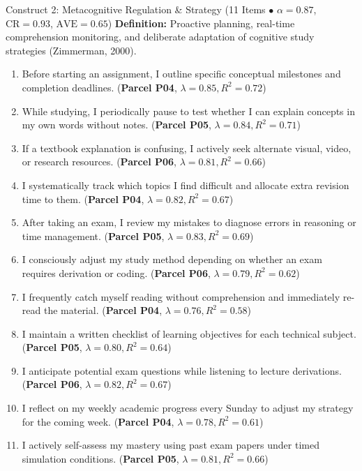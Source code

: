 \documentclass[10pt,a4paper]{article}
\begin{document}
\vspace{0.2cm}
\begin{constructbox}{Construct 2: Metacognitive Regulation \& Strategy (11 Items $\bullet$ $\alpha = 0.87$, $\text{CR} = 0.93$, $\text{AVE} = 0.65$)}
\textbf{Definition:} Proactive planning, real-time comprehension monitoring, and deliberate adaptation of cognitive study strategies (Zimmerman, 2000).
\begin{enumerate}[label=\textbf{Q\arabic*.}, leftmargin=2.5em, itemsep=2pt, resume]
  \item Before starting an assignment, I outline specific conceptual milestones and completion deadlines. \hfill (\textbf{Parcel P04}, $\lambda = 0.85, R^2 = 0.72$)
  \item While studying, I periodically pause to test whether I can explain concepts in my own words without notes. \hfill (\textbf{Parcel P05}, $\lambda = 0.84, R^2 = 0.71$)
  \item If a textbook explanation is confusing, I actively seek alternate visual, video, or research resources. \hfill (\textbf{Parcel P06}, $\lambda = 0.81, R^2 = 0.66$)
  \item I systematically track which topics I find difficult and allocate extra revision time to them. \hfill (\textbf{Parcel P04}, $\lambda = 0.82, R^2 = 0.67$)
  \item After taking an exam, I review my mistakes to diagnose errors in reasoning or time management. \hfill (\textbf{Parcel P05}, $\lambda = 0.83, R^2 = 0.69$)
  \item I consciously adjust my study method depending on whether an exam requires derivation or coding. \hfill (\textbf{Parcel P06}, $\lambda = 0.79, R^2 = 0.62$)
  \item I frequently catch myself reading without comprehension and immediately re-read the material. \hfill (\textbf{Parcel P04}, $\lambda = 0.76, R^2 = 0.58$)
  \item I maintain a written checklist of learning objectives for each technical subject. \hfill (\textbf{Parcel P05}, $\lambda = 0.80, R^2 = 0.64$)
  \item I anticipate potential exam questions while listening to lecture derivations. \hfill (\textbf{Parcel P06}, $\lambda = 0.82, R^2 = 0.67$)
  \item I reflect on my weekly academic progress every Sunday to adjust my strategy for the coming week. \hfill (\textbf{Parcel P04}, $\lambda = 0.78, R^2 = 0.61$)
  \item I actively self-assess my mastery using past exam papers under timed simulation conditions. \hfill (\textbf{Parcel P05}, $\lambda = 0.81, R^2 = 0.66$)
\end{enumerate}
\end{constructbox}
\end{document}
